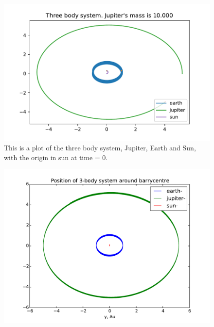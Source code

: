 \begin{figure}[H]
\includegraphics[width=0.9\linewidth]{../results/plots/Jupitermass_is_1_0000_earth.pdf}\caption{This is a plot of the three body system, Jupiter, Earth and Sun, with the origin in sun at time = 0.}\label{fig:three_body_sun_origin}
\end{figure}



\begin{figure}
	\centering
	\includegraphics[width=0.9\linewidth]{../results/plots/3bodyCentric_position}
	\caption{}
	\label{fig:3bodycentricposition}
\end{figure}

